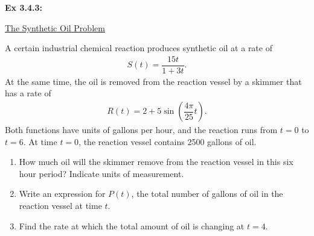 \begin{tcolorbox}[example]
    \textbf{Ex 3.4.3: } \begin{center}
        \underline{The Synthetic Oil Problem}
    \end{center} \vspace{11pt}
    A certain industrial chemical reaction produces synthetic oil at a rate of \begin{align*}
        S(t) = \dfrac{15t}{1 + 3t}.
    \end{align*}
    At the same time, the oil is removed from the reaction vessel by a skimmer that has a rate of \begin{align*}
        R(t) = 2 + 5\sin \left(\dfrac{4\pi}{25}t\right).
    \end{align*}
    Both functions have units of gallons per hour, and the reaction runs from $t = 0$ to $t = 6$. At time $t = 0$, the reaction vessel contains 2500 gallons of oil. \\
    \begin{enumerate}[label=\hspace{11pt}(\alph*), align=left, leftmargin=*, labelsep=0.25em]
        \item How much oil will the skimmer remove from the reaction vessel in this six hour period? Indicate units of measurement. \\
        \item Write an expression for $P(t)$, the total number of gallons of oil in the reaction vessel at time $t$. \\
        \item Find the rate at which the total amount of oil is changing at $t = 4$.
    \end{enumerate}
\end{tcolorbox}
